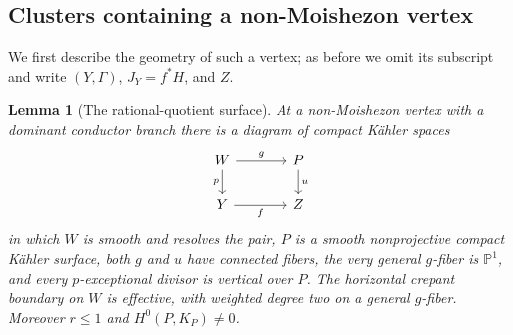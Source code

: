 \documentclass[11pt,letterpaper]{article}
\newtheorem{lemma}[theorem]{Lemma}
\theoremstyle{definition}
\theoremstyle{remark}
\begin{document}
\subsection{Clusters containing a non-Moishezon vertex}

We first describe the geometry of such a vertex; as before we omit
its subscript and write $(Y,\Gamma)$, $J_Y=f^*H$, and $Z$.

\begin{lemma}[The rational-quotient surface]
\label{floor:quotient-surface}
At a non-Moishezon vertex with a dominant conductor branch there is
a diagram of compact K\"ahler spaces
\begin{equation}
 \label{floor:quotient-diagram}
 \begin{tikzcd}[column sep=large]
 W \arrow[r,"g"] \arrow[d,"p"'] & P \arrow[d,"u"]\\
 Y \arrow[r,"f"'] & Z
 \end{tikzcd}
\end{equation}
in which $W$ is smooth and resolves the pair, $P$ is a smooth
nonprojective compact K\"ahler surface, both $g$ and $u$ have
connected fibers, the very general $g$-fiber is $\mathbb{P}^1$, and every
$p$-exceptional divisor is vertical over $P$.  The horizontal
crepant boundary on $W$ is effective, with weighted degree two on
a general $g$-fiber.  Moreover $r\le1$ and
$H^0(P,K_P)\ne0$.
\end{lemma}
\end{document}
